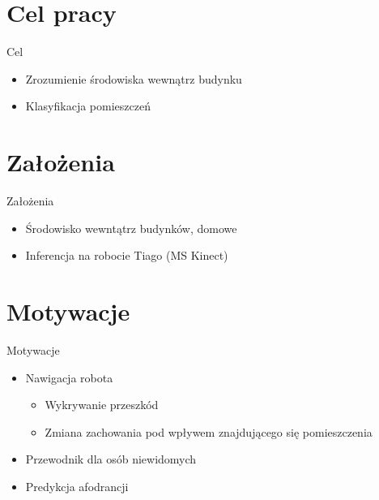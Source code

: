 \documentclass[10pt]{beamer}
\begin{document}
\section[Cel pracy]{Cel pracy}
\begin{frame}{Cel}
 \begin{itemize}
     \item Zrozumienie środowiska wewnątrz budynku
     \item Klasyfikacja pomieszczeń
 \end{itemize}
\end{frame}
\section[Założenia]{Założenia}
\begin{frame}{Założenia}

 \begin{itemize}
     \item Środowisko wewntątrz budynków, domowe
     \item Inferencja na robocie Tiago (MS Kinect)
 \end{itemize}
\end{frame}

\section[Motywacje]{Motywacje}
\begin{frame}{Motywacje}

 \begin{itemize}
     \item Nawigacja robota
     \begin{itemize}
         \item Wykrywanie przeszkód
         \item Zmiana zachowania pod wpływem znajdującego się pomieszczenia
     \end{itemize}
     \item Przewodnik dla osób niewidomych
     \item Predykcja afodrancji
 \end{itemize}
\end{frame}
\end{document}
